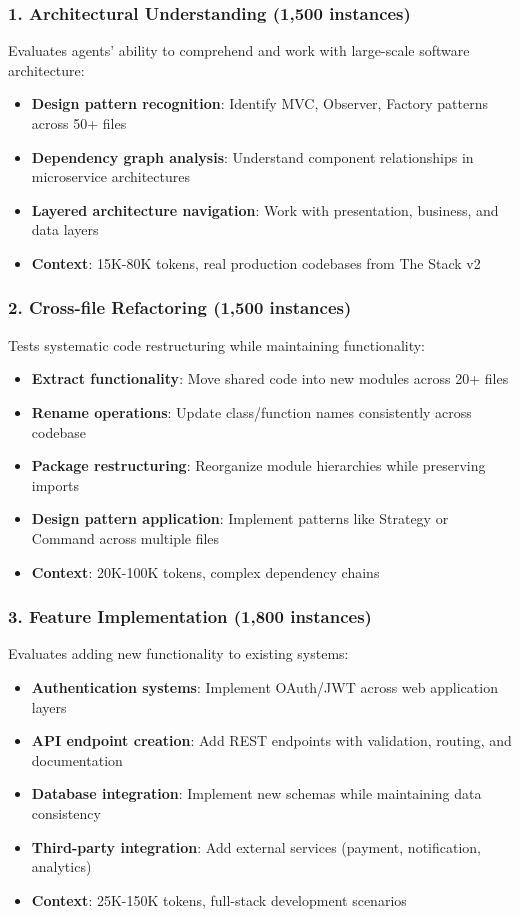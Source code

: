 \documentclass{article}
\begin{document}
\subsubsection{1. Architectural Understanding (1,500 instances)}
Evaluates agents' ability to comprehend and work with large-scale software architecture:
\begin{itemize}
    \item \textbf{Design pattern recognition}: Identify MVC, Observer, Factory patterns across 50+ files
    \item \textbf{Dependency graph analysis}: Understand component relationships in microservice architectures
    \item \textbf{Layered architecture navigation}: Work with presentation, business, and data layers
    \item \textbf{Context}: 15K-80K tokens, real production codebases from The Stack v2
\end{itemize}

\subsubsection{2. Cross-file Refactoring (1,500 instances)}
Tests systematic code restructuring while maintaining functionality:
\begin{itemize}
    \item \textbf{Extract functionality}: Move shared code into new modules across 20+ files
    \item \textbf{Rename operations}: Update class/function names consistently across codebase
    \item \textbf{Package restructuring}: Reorganize module hierarchies while preserving imports
    \item \textbf{Design pattern application}: Implement patterns like Strategy or Command across multiple files
    \item \textbf{Context}: 20K-100K tokens, complex dependency chains
\end{itemize}

\subsubsection{3. Feature Implementation (1,800 instances)}
Evaluates adding new functionality to existing systems:
\begin{itemize}
    \item \textbf{Authentication systems}: Implement OAuth/JWT across web application layers
    \item \textbf{API endpoint creation}: Add REST endpoints with validation, routing, and documentation
    \item \textbf{Database integration}: Implement new schemas while maintaining data consistency
    \item \textbf{Third-party integration}: Add external services (payment, notification, analytics)
    \item \textbf{Context}: 25K-150K tokens, full-stack development scenarios
\end{itemize}
\end{document}
